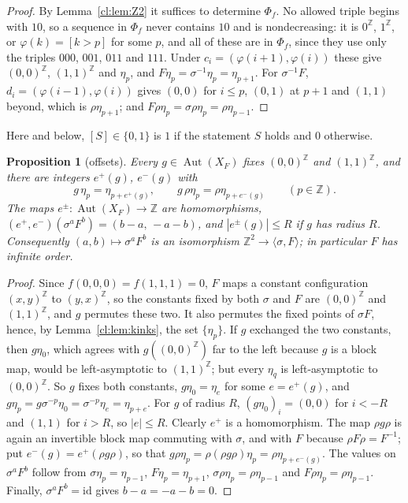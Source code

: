 \documentclass[11pt]{amsart}
\newtheorem{proposition}[theorem]{Proposition}
\theoremstyle{definition}
\theoremstyle{remark}
\theoremstyle{plain}
\newcommand{\Z}{\mathbb{Z}}
\newcommand{\Aut}{\operatorname{Aut}}
\newcommand{\sh}{\sigma}
\begin{document}
\begin{proof}
By Lemma~\ref{cl:lem:Z2} it suffices to determine $\Phi_f$. No allowed triple begins with $10$, so a sequence in $\Phi_f$ never contains $10$ and is nondecreasing: it is $0^{\Z}$, $1^{\Z}$, or $\varphi(k)=[k>p]$ for some $p$, and all of these are in $\Phi_f$, since they use only the triples $000$, $001$, $011$ and $111$. Under $c_i=(\varphi(i+1),\varphi(i))$ these give $(0,0)^{\Z}$, $(1,1)^{\Z}$ and $\eta_p$, and $F\eta_p=\sh^{-1}\eta_p=\eta_{p+1}$. For $\sh^{-1}F$, $d_i=(\varphi(i-1),\varphi(i))$ gives $(0,0)$ for $i\le p$, $(0,1)$ at $p+1$ and $(1,1)$ beyond, which is $\rho\eta_{p+1}$; and $F\rho\eta_p=\sh\rho\eta_p=\rho\eta_{p-1}$.
\end{proof}

Here and below, $[S]\in\{0,1\}$ is $1$ if the statement $S$ holds and $0$ otherwise.

\begin{proposition}[offsets]\label{cl:prop:offsets}
Every $g\in\Aut(X_F)$ fixes $(0,0)^{\Z}$ and $(1,1)^{\Z}$, and there are integers $e^+(g)$, $e^-(g)$ with
\[
g\,\eta_p=\eta_{p+e^+(g)},\qquad g\,\rho\eta_p=\rho\eta_{p+e^-(g)}\qquad(p\in\Z).
\]
The maps $e^\pm\colon\Aut(X_F)\to\Z$ are homomorphisms, $(e^+,e^-)(\sh^aF^b)=(b-a,\,-a-b)$, and $|e^\pm(g)|\le R$ if $g$ has radius $R$. Consequently $(a,b)\mapsto\sh^aF^b$ is an isomorphism $\Z^2\to\langle\sh,F\rangle$; in particular $F$ has infinite order.
\end{proposition}

\begin{proof}
Since $f(0,0,0)=f(1,1,1)=0$, $F$ maps a constant configuration $(x,y)^{\Z}$ to $(y,x)^{\Z}$, so the constants fixed by both $\sh$ and $F$ are $(0,0)^{\Z}$ and $(1,1)^{\Z}$, and $g$ permutes these two. It also permutes the fixed points of $\sh F$, hence, by Lemma~\ref{cl:lem:kinks}, the set $\{\eta_p\}$. If $g$ exchanged the two constants, then $g\eta_0$, which agrees with $g((0,0)^{\Z})$ far to the left because $g$ is a block map, would be left-asymptotic to $(1,1)^{\Z}$; but every $\eta_q$ is left-asymptotic to $(0,0)^{\Z}$. So $g$ fixes both constants, $g\eta_0=\eta_{e}$ for some $e=e^+(g)$, and $g\eta_p=g\sh^{-p}\eta_0=\sh^{-p}\eta_e=\eta_{p+e}$. For $g$ of radius $R$, $(g\eta_0)_i=(0,0)$ for $i<-R$ and $(1,1)$ for $i>R$, so $|e|\le R$. Clearly $e^+$ is a homomorphism. The map $\rho g\rho$ is again an invertible block map commuting with $\sh$, and with $F$ because $\rho F\rho=F^{-1}$; put $e^-(g)=e^+(\rho g\rho)$, so that $g\rho\eta_p=\rho(\rho g\rho)\eta_p=\rho\eta_{p+e^-(g)}$. The values on $\sh^aF^b$ follow from $\sh\eta_p=\eta_{p-1}$, $F\eta_p=\eta_{p+1}$, $\sh\rho\eta_p=\rho\eta_{p-1}$ and $F\rho\eta_p=\rho\eta_{p-1}$. Finally, $\sh^aF^b=\mathrm{id}$ gives $b-a=-a-b=0$.
\end{proof}
\end{document}
